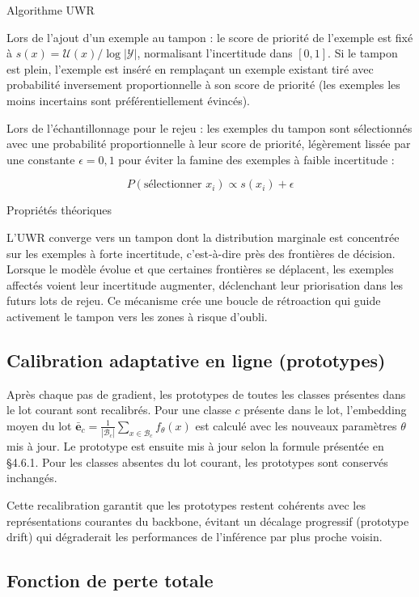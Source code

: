 \documentclass[a4paper,12pt]{report}
\begin{document}
Algorithme UWR

Lors de l'ajout d'un exemple au tampon : le score de priorité de l'exemple est fixé à $s(x) = \mathcal{U}(x) / \log |\mathcal{Y}|$, normalisant l'incertitude dans $[0, 1]$. Si le tampon est plein, l'exemple est inséré en remplaçant un exemple existant tiré avec probabilité inversement proportionnelle à son score de priorité (les exemples les moins incertains sont préférentiellement évincés).

Lors de l'échantillonnage pour le rejeu : les exemples du tampon sont sélectionnés avec une probabilité proportionnelle à leur score de priorité, légèrement lissée par une constante $\epsilon = 0{,}1$ pour éviter la famine des exemples à faible incertitude :

$$P(\text{sélectionner } x_i) \propto s(x_i) + \epsilon$$

Propriétés théoriques

L'UWR converge vers un tampon dont la distribution marginale est concentrée sur les exemples à forte incertitude, c'est-à-dire près des frontières de décision. Lorsque le modèle évolue et que certaines frontières se déplacent, les exemples affectés voient leur incertitude augmenter, déclenchant leur priorisation dans les futurs lots de rejeu. Ce mécanisme crée une boucle de rétroaction qui guide activement le tampon vers les zones à risque d'oubli.

\subsection{Calibration adaptative en ligne (prototypes)}

Après chaque pas de gradient, les prototypes de toutes les classes présentes dans le lot courant sont recalibrés. Pour une classe $c$ présente dans le lot, l'embedding moyen du lot $\bar{\boldsymbol{e}}_c = \frac{1}{|\mathcal{B}_c|}\sum_{x \in \mathcal{B}_c} f_\theta(x)$ est calculé avec les nouveaux paramètres $\theta$ mis à jour. Le prototype est ensuite mis à jour selon la formule présentée en §4.6.1. Pour les classes absentes du lot courant, les prototypes sont conservés inchangés.

Cette recalibration garantit que les prototypes restent cohérents avec les représentations courantes du backbone, évitant un décalage progressif (prototype drift) qui dégraderait les performances de l'inférence par plus proche voisin.

\subsection{Fonction de perte totale}
\end{document}

